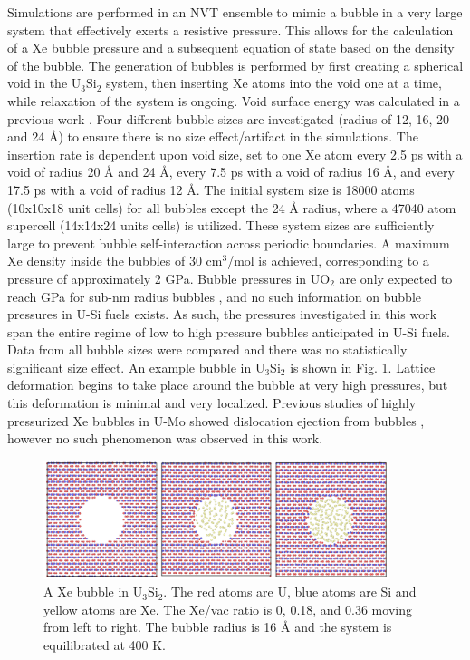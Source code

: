 \documentclass[review]{elsarticle}
\providecommand{\DIFaddtex}[1]{{\protect\color{blue} \sf #1}} %
\providecommand{\DIFaddbegin}{} %
\providecommand{\DIFaddend}{} %
\providecommand{\DIFadd}[1]{\texorpdfstring{\DIFaddtex{#1}}{#1}} %
\newcommand{\DIFaddincludegraphics}[2][]{{\color{blue}\fbox{\DIFOincludegraphics[#1]{#2}}}} %
\DeclareRobustCommand{\DIFaddbegin}{\DIFOaddbegin \let\includegraphics\DIFaddincludegraphics} %
\DeclareRobustCommand{\DIFaddend}{\DIFOaddend \let\includegraphics\DIFOincludegraphics} %
\begin{document}
Simulations are performed in an NVT ensemble to mimic a bubble in a very large system that effectively exerts a resistive pressure. This allows for the calculation of a Xe bubble pressure and a subsequent equation of state based on the density of the bubble. The generation of bubbles is performed by first creating a spherical void in the U$_3$Si$_2$ system, then inserting Xe atoms into the void one at a time, while relaxation of the system is ongoing. Void surface energy was calculated in a previous work \cite{beeler_usi_gb}. Four different bubble sizes are investigated (radius of 12, 16, 20 and 24 {\AA}) to ensure there is no size effect/artifact in the simulations. The insertion rate is dependent upon void size, set to one Xe atom every 2.5 ps with a void of radius 20 {\AA} and 24 {\AA}, every 7.5 ps with a void of radius 16 {\AA}, and every 17.5 ps with a void of radius 12 {\AA}. The initial system size is 18000 atoms (10x10x18 unit cells) for all bubbles except the 24 {\AA} radius, where a 47040 atom supercell (14x14x24 units cells) is utilized. These system sizes are sufficiently large to prevent bubble self-interaction across periodic boundaries. \DIFaddbegin \DIFadd{A maximum Xe density inside the bubbles of 30 cm$^3$/mol is achieved, corresponding to a pressure of approximately 2 GPa. Bubble pressures in UO$_2$ are only expected to reach GPa for sub-nm radius bubbles \cite{une2002, nogita1998}, and no such information on bubble pressures in U-Si fuels exists. As such, the pressures investigated in this work span the entire regime of low to high pressure bubbles anticipated in U-Si fuels. }\DIFaddend Data from all bubble sizes were compared and there was no statistically significant size effect. An example bubble in U$_3$Si$_2$ is shown in Fig. \ref{fig:bub}. \DIFaddbegin \DIFadd{Lattice deformation begins to take place around the bubble at very high pressures, but this deformation is minimal and very localized. Previous studies of highly pressurized Xe bubbles in U-Mo showed dislocation ejection from bubbles \cite{hu2017}, however no such phenomenon was observed in this work. 
}\DIFaddend 

\begin{figure}[hbt]
	\centering
	\includegraphics[width=0.9\textwidth]{bub_ex4.png}
 \caption{A Xe bubble in U$_3$Si$_2$. The red atoms are U, blue atoms are Si and yellow atoms are Xe. The Xe/vac ratio is 0, 0.18, and 0.36 moving from left to right. The bubble radius is 16 {\AA} and the system is equilibrated at 400 K.}\label{fig:bub}
\end{figure}
\end{document}
